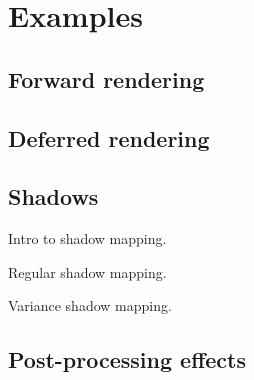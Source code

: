 
\chapter{ Examples }
\label{Chapter6}

\section{Forward rendering}
\section{Deferred rendering}
\section{Shadows}

Intro to shadow mapping.

Regular shadow mapping.

Variance shadow mapping.

\section{Post-processing effects}
